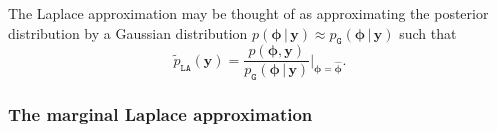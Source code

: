 \documentclass[a4paper, nobind]{templates/ociamthesis}
\begin{document}
The Laplace approximation may be thought of as approximating the posterior distribution by a Gaussian distribution \(p(\boldsymbol{\mathbf{\phi}} \, | \, \mathbf{y}) \approx p_\texttt{G}(\boldsymbol{\mathbf{\phi}} \, | \, \mathbf{y})\) such that
\begin{equation}
\tilde p_{\texttt{LA}}(\mathbf{y}) = \frac{p(\boldsymbol{\mathbf{\phi}}, \mathbf{y})}{p_\texttt{G}(\boldsymbol{\mathbf{\phi}} \, | \, \mathbf{y})} \Big\rvert_{\boldsymbol{\mathbf{\phi}} = \hat{\boldsymbol{\mathbf{\phi}}}}.
\end{equation}

\hypertarget{the-marginal-laplace-approximation}{%
\subsubsection{The marginal Laplace approximation}\label{the-marginal-laplace-approximation}}
\end{document}
